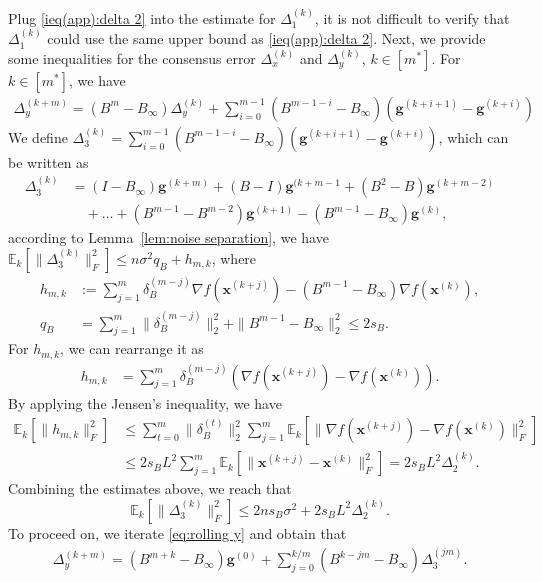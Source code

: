 \documentclass[10pt]{article}
\newcommand{\vg}{{\mathbf{g}}}
\newcommand{\vx}{{\mathbf{x}}}
\newcommand{\EE}{\mathbb{E}}
\newcommand{\norm}[1]{\| #1 \|}
\begin{document}
Plug \eqref{ieq(app):delta 2} into the estimate for $\Delta_1^{(k)}$, it is not difficult to verify that $\Delta_1^{(k)}$ could use the same upper bound as \eqref{ieq(app):delta 2}. Next, we provide some inequalities for the consensus error $\Delta_x^{(k)}$ and $\Delta_y^{(k)}$, $k\in[m^*]$. For $k\in [m^*]$, we have     
\begin{align}\label{eq:rolling y}
    \Delta_y^{(k+m)}=(B^m-B_\infty)\Delta_y^{(k)}+\sum_{i=0}^{m-1}(B^{m-1-i}-B_\infty)(\vg^{(k+i+1)}-\vg^{(k+i)})
\end{align}
We define 
\(
\Delta_3^{(k)}=\sum_{i=0}^{m-1}(B^{m-1-i}-B_\infty)(\vg^{(k+i+1)}-\vg^{(k+i)})\), which can be written as 
\begin{align*}
    \Delta_3^{(k)}&=(I-B_\infty)\vg^{(k+m)}+(B-I)\vg^{(k+m-1}+(B^2-B)\vg^{(k+m-2)}\\
    &\quad+\ldots+(B^{m-1}-B^{m-2})\vg^{(k+1)}-(B^{m-1}-B_\infty)\vg^{(k)},
\end{align*}
according to Lemma~\ref{lem:noise separation}, we have \(\EE_k[\norm{\Delta_3^{(k)}}_F^2]\le n\sigma^2 q_B+ h_{m,k}\),
where
\begin{align*}
    h_{m,k}&:=\sum_{j=1}^m\delta_B^{(m-j)}\nabla f(\vx^{(k+j)})-(B^{m-1}-B_\infty)\nabla f(\vx^{(k)}),\\
    q_B&=\sum_{j=1}^m\norm{\delta_B^{(m-j)}}_2^2+\norm{B^{m-1}-B_\infty}_2^2\le 2s_B.
\end{align*}
For $h_{m,k}$, we can rearrange it as
\begin{align*}
    h_{m,k}&=\sum_{j=1}^m\delta_B^{(m-j)}(\nabla f(\vx^{(k+j)})-\nabla f(\vx^{(k)})).
\end{align*}
By applying the Jensen's inequality, we have
\begin{align*}
    \EE_k[\norm{h_{m,k}}_F^2]&\le \sum_{t=0}^{m}\norm{\delta_B^{(t)}}_2^2 \sum_{j=1}^m\EE_k[\norm{\nabla f(\vx^{(k+j)})-\nabla f(\vx^{(k)})}_F^2]\\
    &\le 2s_B L^2\sum_{j=1}^m \EE_k[\norm{\vx^{(k+j)}-\vx^{(k)}}_F^2]   = 2s_BL^2\Delta_2^{(k)}.
\end{align*}
Combining the estimates above, we reach that 
\[\EE_k[\norm{\Delta_3^{(k)}}_F^2]\le 2ns_B\sigma^2 +2s_BL^2\Delta_2^{(k)}. \]
To proceed on, we iterate \eqref{eq:rolling y} and obtain that
\begin{align*}
    \Delta_y^{(k+m)} = (B^{m+k}-B_\infty)\vg^{(0)}+ \sum_{j=0}^{k/m}(B^{k-jm}-B_\infty)\Delta_3^{(jm)}.
\end{align*}
\end{document}
